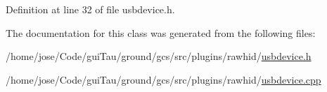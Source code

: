 Definition at line 32 of file usbdevice.\-h.



The documentation for this class was generated from the following files\-:\begin{DoxyCompactItemize}
\item 
/home/jose/\-Code/gui\-Tau/ground/gcs/src/plugins/rawhid/\hyperlink{usbdevice_8h}{usbdevice.\-h}\item 
/home/jose/\-Code/gui\-Tau/ground/gcs/src/plugins/rawhid/\hyperlink{usbdevice_8cpp}{usbdevice.\-cpp}\end{DoxyCompactItemize}
